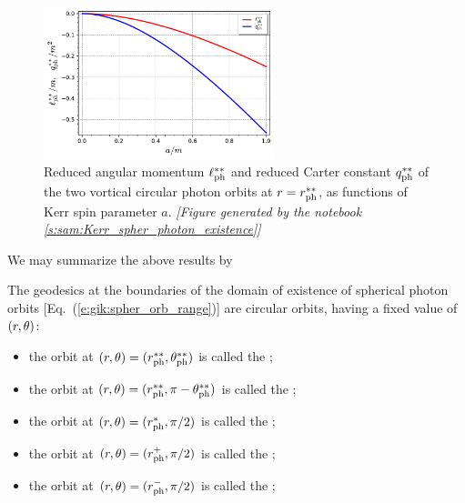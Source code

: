 \begin{figure}
\centerline{\includegraphics[width=0.6\textwidth]{gik_ell_q_rss.pdf}}
\caption[]{\label{f:gik:ell_q_rss} \footnotesize
Reduced angular momentum $\ell_{\rm ph}^{**}$ and reduced Carter constant
$q_{\rm ph}^{**}$ of the two vortical circular photon orbits
at $r = r_{\rm ph}^{**}$, as
functions of Kerr spin parameter $a$.
\textsl{[Figure generated by the notebook \ref{s:sam:Kerr_spher_photon_existence}]}
}
\end{figure}

We may summarize the above results by
\begin{greybox}
The geodesics at the boundaries of the domain of
existence of spherical photon orbits [Eq.~(\ref{e:gik:spher_orb_range})] are circular orbits, having a fixed value of $(r,\theta)$:
\begin{itemize}
\item the orbit at $(r,\theta)=(r_{\rm ph}^{**},\theta_{\rm ph}^{**})$ is called
the ;
\item the orbit at $(r,\theta)=(r_{\rm ph}^{**},\pi - \theta_{\rm ph}^{**})$ is called
the ;
\item the orbit at $(r,\theta)=(r_{\rm ph}^*,\pi/2)$ is called the ;
\item the orbit at $(r,\theta)=(r_{\rm ph}^+,\pi/2)$ is called the ;
\item the orbit at $(r,\theta)=(r_{\rm ph}^-,\pi/2)$ is called the ;
\end{itemize}
\end{greybox}

